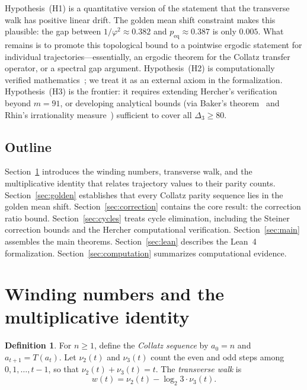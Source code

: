 \documentclass[manuscript]{aomart}
\theoremstyle{plain}
\theoremstyle{definition}
\newtheorem{definition}[theorem]{Definition}
\theoremstyle{remark}
\numberwithin{equation}{section}
\begin{document}
Hypothesis~(H1) is a quantitative version of the statement that the
transverse walk has positive linear drift.  The golden mean shift
constraint makes this plausible: the gap between
$1/\varphi^2 \approx 0.382$ and $p_{\mathrm{eq}} \approx 0.387$ is
only $0.005$.  What remains is to promote this topological bound to a
pointwise ergodic statement for individual trajectories---essentially,
an ergodic theorem for the Collatz transfer operator, or a spectral
gap argument.  Hypothesis~(H2) is computationally verified
mathematics~\cite{Hercher2024}; we treat it as an external axiom in
the formalization.  Hypothesis~(H3) is the frontier: it requires
extending Hercher's verification beyond $m = 91$, or developing
analytical bounds (via Baker's theorem~\cite{Baker1975} and Rhin's
irrationality measure~\cite{Rhin1987}) sufficient to cover all
$\Delta_3 \ge 80$.

\subsection{Outline}

Section~\ref{sec:winding} introduces the winding numbers, transverse
walk, and the multiplicative identity that relates trajectory values
to their parity counts.  Section~\ref{sec:golden} establishes that
every Collatz parity sequence lies in the golden mean shift.
Section~\ref{sec:correction} contains the core result: the correction
ratio bound.  Section~\ref{sec:cycles} treats cycle elimination,
including the Steiner correction bounds and the Hercher computational
verification.  Section~\ref{sec:main} assembles the main theorems.
Section~\ref{sec:lean} describes the Lean~4 formalization.
Section~\ref{sec:computation} summarizes computational evidence.

\section{Winding numbers and the multiplicative identity}
\label{sec:winding}

\begin{definition}\label{def:parity-counts}
For $n \ge 1$, define the \emph{Collatz sequence} by $a_0 = n$ and
$a_{t+1} = T(a_t)$.  Let $\nu_2(t)$ and $\nu_3(t)$ count the even
and odd steps among $0, 1, \ldots, t-1$, so that
$\nu_2(t) + \nu_3(t) = t$.  The \emph{transverse walk} is
\begin{equation}\label{eq:walk}
  w(t) = \nu_2(t) - \log_2 3 \cdot \nu_3(t).
\end{equation}
\end{definition}
\end{document}
